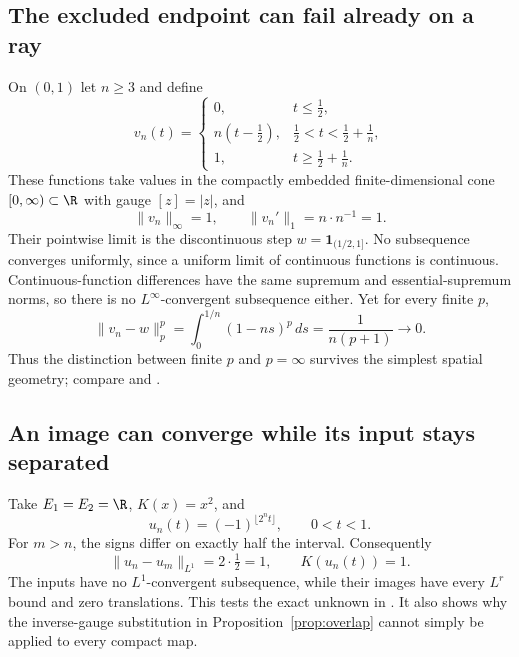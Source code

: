 \documentclass[12pt,reqno]{amsart}
\begin{document}
\subsection{The excluded endpoint can fail already on a ray}
On $(0,1)$ let $n\ge3$ and define
\[
v_n(t)=\begin{cases}
0,&t\le\tfrac12,\\
n(t-\tfrac12),&\tfrac12<t<\tfrac12+\tfrac1n,\\
1,&t\ge\tfrac12+\tfrac1n.
\end{cases}
\]
These functions take values in the compactly embedded finite-dimensional cone $[0,\infty)\subset\R$ with gauge $[z]=|z|$, and
\[
\|v_n\|_\infty=1,\qquad \|v_n'\|_1=n\cdot n^{-1}=1.
\]
Their pointwise limit is the discontinuous step $w=\mathbf1_{(1/2,1]}$. No subsequence converges uniformly, since a uniform limit of continuous functions is continuous. Continuous-function differences have the same supremum and essential-supremum norms, so there is no $L^\infty$-convergent subsequence either. Yet for every finite $p$,
\begin{equation}\label{eq:ramp}
\|v_n-w\|_p^p=\int_0^{1/n}(1-ns)^p\,ds=\frac1{n(p+1)}\longrightarrow0.
\end{equation}
Thus the distinction between finite $p$ and $p=\infty$ survives the simplest spatial geometry; compare \cite[Corollary 4, pp.~85--86; Proposition 3, p.~94]{S-simon} and \cite[Remark 2, p.~4]{S-barrett-suli}.
\subsection{An image can converge while its input stays separated}
Take $E_1=E_2=\R$, $K(x)=x^2$, and
\[
u_n(t)=(-1)^{\lfloor 2^nt\rfloor},\qquad 0<t<1.
\]
For $m>n$, the signs differ on exactly half the interval. Consequently
\[
\|u_n-u_m\|_{L^1}=2\cdot\tfrac12=1,
\qquad K(u_n(t))=1.
\]
The inputs have no $L^1$-convergent subsequence, while their images have every $L^r$ bound and zero translations. This tests the exact unknown in \cite[Theorem 2.1 and Remark 2.2(3), p.~1726]{S-maitre}. It also shows why the inverse-gauge substitution in Proposition~\ref{prop:overlap} cannot simply be applied to every compact map.
\end{document}
